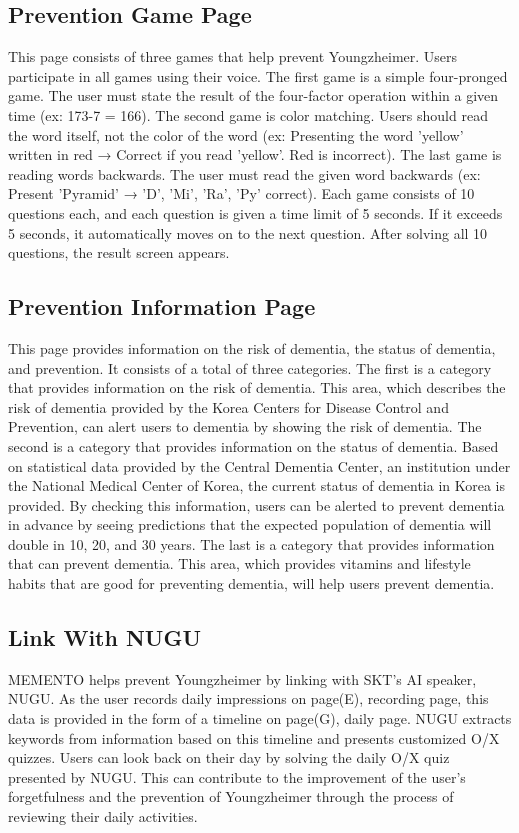 \documentclass[conference]{IEEEtran}
\begin{document}
\subsection{Prevention Game Page}
This page consists of three games that help prevent Youngzheimer. Users participate in all games using their voice. The first game is a simple four-pronged game. The user must state the result of the four-factor operation within a given time (ex: 173-7 = 166). The second game is color matching. Users should read the word itself, not the color of the word (ex: Presenting the word 'yellow' written in red → Correct if you read 'yellow'. Red is incorrect). The last game is reading words backwards. The user must read the given word backwards (ex: Present 'Pyramid' → 'D', 'Mi', 'Ra', 'Py' correct). Each game consists of 10 questions each, and each question is given a time limit of 5 seconds.  If it exceeds 5 seconds, it automatically moves on to the next question. After solving all 10 questions, the result screen appears.
\\
\subsection{Prevention Information Page}
This page provides information on the risk of dementia, the status of dementia, and prevention. It consists of a total of three categories. The first is a category that provides information on the risk of dementia. This area, which describes the risk of dementia provided by the Korea Centers for Disease Control and Prevention, can alert users to dementia by showing the risk of dementia. The second is a category that provides information on the status of dementia. Based on statistical data provided by the Central Dementia Center, an institution under the National Medical Center of Korea, the current status of dementia in Korea is provided. By checking this information, users can be alerted to prevent dementia in advance by seeing predictions that the expected population of dementia will double in 10, 20, and 30 years. The last is a category that provides information that can prevent dementia. This area, which provides vitamins and lifestyle habits that are good for preventing dementia, will help users prevent dementia.
\\
\subsection{Link With NUGU}
MEMENTO helps prevent Youngzheimer by linking with SKT’s AI speaker, NUGU. As the user records daily impressions on page(E), recording page, this data is provided in the form of a timeline on page(G), daily page. NUGU extracts keywords from information based on this timeline and presents customized O/X quizzes. Users can look back on their day by solving the daily O/X quiz presented by NUGU. This can contribute to the improvement of the user's forgetfulness and the prevention of Youngzheimer through the process of reviewing their daily activities.
\\
\end{document}
